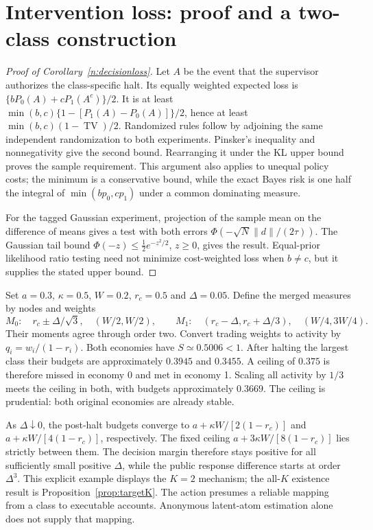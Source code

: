 \documentclass[12pt]{article}
\theoremstyle{definition}
\theoremstyle{remark}
\begin{document}
\section{Intervention loss: proof and a two-class construction}\label{app:revisiondecision}

\begin{proof}[Proof of Corollary~\ref{n:decisionloss}]
Let $A$ be the event that the supervisor authorizes the class-specific halt. Its equally weighted expected loss is $\{bP_0(A)+cP_1(A^c)\}/2$. It is at least
$\min(b,c)\{1-[P_1(A)-P_0(A)]\}/2$, hence at least $\min(b,c)(1-\operatorname{TV})/2$. Randomized rules follow by adjoining the same independent randomization to both experiments. Pinsker's inequality and nonnegativity give the second bound. Rearranging it under the KL upper bound proves the sample requirement. This argument also applies to unequal policy costs; the minimum is a conservative bound, while the exact Bayes risk is one half the integral of $\min(bp_0,cp_1)$ under a common dominating measure.

For the tagged Gaussian experiment, projection of the sample mean on the difference of means gives a test with both errors $\Phi(-\sqrt N\|d\|/(2\tau))$. The Gaussian tail bound $\Phi(-z)\le\tfrac12 e^{-z^2/2}$, $z\ge0$, gives the result. Equal-prior likelihood ratio testing need not minimize cost-weighted loss when $b\ne c$, but it supplies the stated upper bound.
\end{proof}

Set $a=0.3$, $\kappa=0.5$, $W=0.2$, $r_c=0.5$ and $\Delta=0.05$. Define the merged measures by nodes and weights
\[
M_0:\quad r_c\pm\Delta/\sqrt3,\quad (W/2,W/2),
\qquad
M_1:\quad (r_c-\Delta,r_c+\Delta/3),\quad(W/4,3W/4).
\]
Their moments agree through order two. Convert trading weights to activity by $q_i=w_i/(1-r_i)$. Both economies have $S\simeq0.5006<1$. After halting the largest class their budgets are approximately $0.3945$ and $0.3455$. A ceiling of $0.375$ is therefore missed in economy 0 and met in economy 1. Scaling all activity by $1/3$ meets the ceiling in both, with budgets approximately $0.3669$. The ceiling is prudential: both original economies are already stable.

As $\Delta\downarrow0$, the post-halt budgets converge to $a+\kappa W/[2(1-r_c)]$ and $a+\kappa W/[4(1-r_c)]$, respectively. The fixed ceiling $a+3\kappa W/[8(1-r_c)]$ lies strictly between them. The decision margin therefore stays positive for all sufficiently small positive $\Delta$, while the public response difference starts at order $\Delta^3$. This explicit example displays the $K=2$ mechanism; the all-$K$ existence result is Proposition~\ref{prop:targetK}. The action presumes a reliable mapping from a class to executable accounts. Anonymous latent-atom estimation alone does not supply that mapping.
\end{document}
